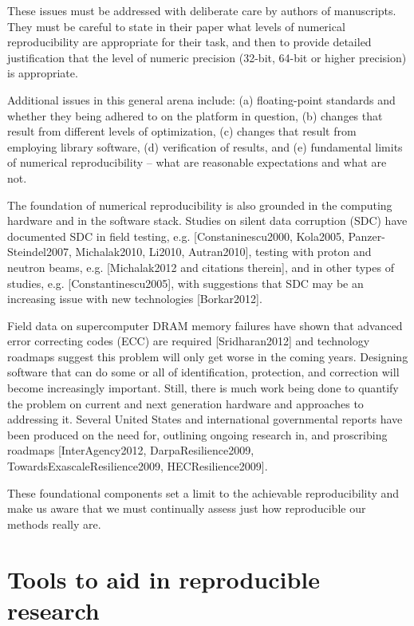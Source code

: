 \documentclass[11pt]{article}
\begin{document}
These issues must be addressed with deliberate care by authors of
manuscripts.  They must be careful to state in their paper what levels of
numerical reproducibility are appropriate for their task, and then to
provide detailed justification that the level of numeric precision (32-bit,
64-bit or higher precision) is appropriate.

Additional issues in this general arena include: (a) floating-point
standards and whether they being adhered to on the platform in question, (b)
changes that result from different levels of optimization, (c) changes that
result from employing library software, (d) verification of results, and (e)
fundamental limits of numerical reproducibility – what are reasonable
expectations and what are not.

The foundation of numerical reproducibility is also grounded in the
computing hardware and in the software stack. Studies on silent data
corruption (SDC)  have documented SDC in field testing, e.g.
[Constaninescu2000, Kola2005, Panzer-Steindel2007, Michalak2010, Li2010,
Autran2010], testing with proton and neutron beams, e.g. [Michalak2012 and
citations therein], and in other types of studies, e.g.
[Constantinescu2005], with suggestions that SDC may be an increasing issue
with new technologies [Borkar2012].  

Field data on supercomputer DRAM memory failures have shown that advanced
error correcting codes (ECC) are required [Sridharan2012] and technology
roadmaps suggest this problem will only get worse in the coming years.
Designing software that can do some or all of identification, protection,
and correction will become increasingly important.  Still, there is much
work being done to quantify the problem on current and next generation
hardware and approaches to addressing it.  Several United States and
international governmental reports have been produced on the need for,
outlining ongoing research in, and proscribing roadmaps [InterAgency2012,
DarpaResilience2009, TowardsExascaleResilience2009, HECResilience2009].

These foundational components set a limit to the achievable reproducibility
and make us aware that we must continually assess just how reproducible our
methods really are.

\section{Tools to aid in reproducible research} \label{sec:tools}
\end{document}
